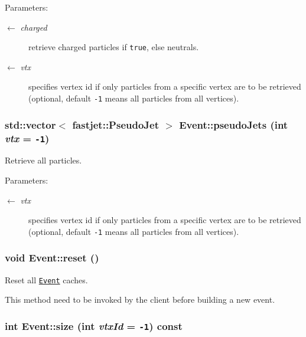 \begin{Desc}
\item[Parameters:]
\begin{description}
\item[\mbox{$\leftarrow$} {\em charged}]retrieve charged particles if {\tt true}, else neutrals. \item[\mbox{$\leftarrow$} {\em vtx}]specifies vertex id if only particles from a specific vertex are to be retrieved (optional, default {\tt -1} means all particles from all vertices). \end{description}
\end{Desc}
\hypertarget{classEvent_d2dbb1309f93d3ebc6279ce5022afe1f}{
\subsubsection[pseudoJets]{\setlength{\rightskip}{0pt plus 5cm}std::vector$<$ fastjet::Pseudo\-Jet $>$ Event::pseudo\-Jets (int {\em vtx} = {\tt -1})}}
\label{classEvent_d2dbb1309f93d3ebc6279ce5022afe1f}


Retrieve all particles. 

\begin{Desc}
\item[Parameters:]
\begin{description}
\item[\mbox{$\leftarrow$} {\em vtx}]specifies vertex id if only particles from a specific vertex are to be retrieved (optional, default {\tt -1} means all particles from all vertices). \end{description}
\end{Desc}
\hypertarget{classEvent_d038b2da9c6d712e704e7c07ff3bf580}{
\subsubsection[reset]{\setlength{\rightskip}{0pt plus 5cm}void Event::reset ()}}
\label{classEvent_d038b2da9c6d712e704e7c07ff3bf580}


Reset all {\tt \hyperlink{classEvent}{Event}} caches. 

This method need to be invoked by the client before building a new event. \hypertarget{classEvent_b998d1732ade0fc0759d15819ca6ae08}{
\subsubsection[size]{\setlength{\rightskip}{0pt plus 5cm}int Event::size (int {\em vtx\-Id} = {\tt -1}) const}}
\label{classEvent_b998d1732ade0fc0759d15819ca6ae08}


